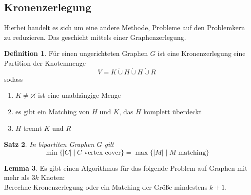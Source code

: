 \documentclass[a4paper, 12pt]{article}
\theoremstyle{plain}
\newtheorem{theorem}{Satz}[section] %
\theoremstyle{definition}
\newtheorem{definition}[theorem]{Definition} %
\theoremstyle{lemma}
\newtheorem{lemma}[theorem]{Lemma}
\theoremstyle{remark}
\theoremstyle{corollary}
\theoremstyle{example}
\begin{document}
	\subsection{Kronenzerlegung}
	Hierbei handelt es sich um eine andere Methode, Probleme auf den Problemkern zu reduzieren. Das geschieht mittels einer Graphenzerlegung.
	\begin{definition}
		Für einen ungerichteten Graphen $G$ ist eine Kronenzerlegung eine Partition der Knotenmenge \[V = K \dot \cup H \dot \cup H \dot \cup R\] sodass \begin{enumerate}
			\item $K \neq \varnothing$ ist eine unabhängige Menge
			\item es gibt ein Matching von $H$ und $K$, das $H$ komplett überdeckt
			\item $H$ trennt $K$ und $R$
		\end{enumerate}
	\end{definition}
	\begin{theorem}
		In bipartiten Graphen $G$ gilt \[\min\{\left|C\right| \mid C \text{ vertex cover}\} = \max\{\left|M\right| \mid M \text{ matching}\}\]
	\end{theorem}
	\begin{lemma}
		Es gibt einen Algorithmus für das folgende Problem auf Graphen mit mehr als $3k$ Knoten:\\
		Berechne Kronenzerlegung oder ein Matching der Größe mindestens $k+1$.
	\end{lemma}
\end{document}
